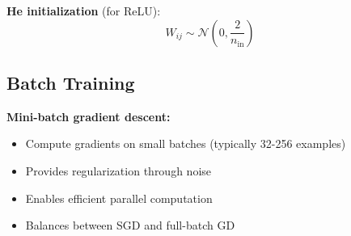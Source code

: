 \textbf{He initialization} (for ReLU):
\begin{equation}
W_{ij} \sim \mathcal{N}\left(0, \frac{2}{n_{\text{in}}}\right)
\end{equation}

\subsection{Batch Training}

\textbf{Mini-batch gradient descent:}
\begin{itemize}
    \item Compute gradients on small batches (typically 32-256 examples)
    \item Provides regularization through noise
    \item Enables efficient parallel computation
    \item Balances between SGD and full-batch GD
\end{itemize}
